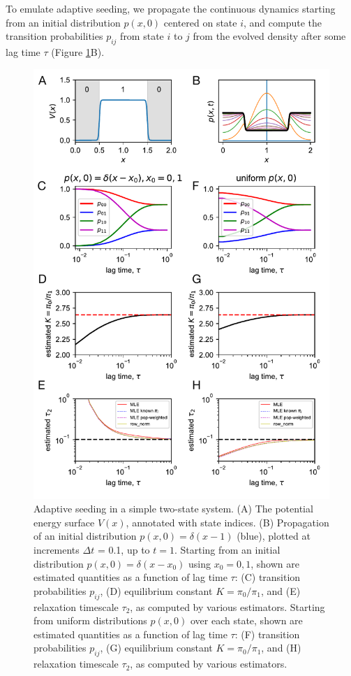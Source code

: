 \documentclass[%
 aip,
rsi,%
 amsmath,amssymb,
 reprint,%
]{revtex4-1}
\begin{document}
To emulate adaptive seeding, we propagate the continuous dynamics starting from an initial distribution $p(x,0)$ centered on state $i$, and compute the transition probabilities $p_{ij}$ from state $i$ to $j$ from the evolved density after some lag time $\tau$ (Figure \ref{fig:fokker}B). 

\begin{figure}[ht!]
\includegraphics[width=0.5\paperwidth]{figures/FokkerPlanck-labeled.pdf}
\caption{Adaptive seeding in a simple two-state system. (A) The potential energy surface $V(x)$, annotated with state indices. (B) Propagation of an initial distribution $p(x,0) = \delta(x-1)$ (blue), plotted at increments $\Delta t$ = 0.1, up to $t=1$. Starting from an initial distribution $p(x,0) = \delta(x-x_0)$ using $x_0 = 0,1$, shown are estimated quantities as a function of lag time $\tau$: (C) transition probabilities $p_{ij}$, (D) equilibrium constant $K = \pi_0/\pi_1$, and (E) relaxation timescale $\tau_2$, as computed by various estimators. Starting from uniform distributions $p(x,0)$ over each state, shown are estimated quantities as a function of lag time $\tau$: (F) transition probabilities $p_{ij}$, (G) equilibrium constant $K = \pi_0/\pi_1$, and (H) relaxation timescale $\tau_2$, as computed by various estimators.}
\label{fig:fokker}
\end{figure}
\end{document}
